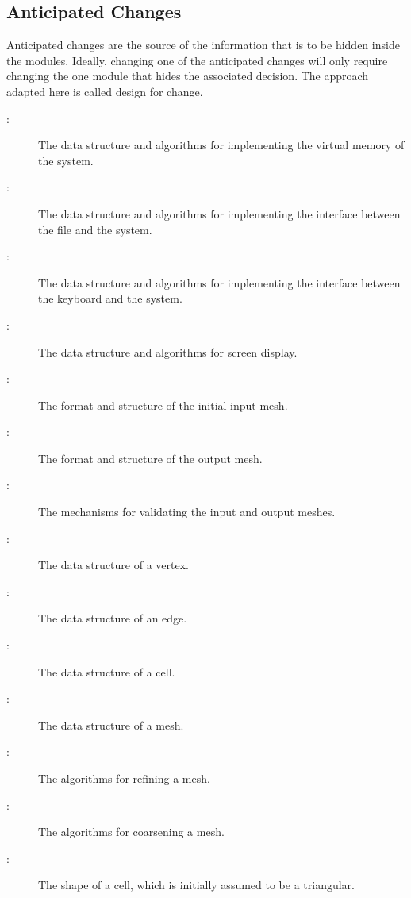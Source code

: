 \documentclass[12pt,titlepage]{article}
\begin{document}
\subsection{Anticipated Changes \label{AmgSecAchange}}
Anticipated changes are the source of the information that is to be hidden inside the modules. Ideally, changing one of the anticipated changes will only require changing the one module that hides the associated decision. The approach adapted here is called design for change. %
\begin{description}
\item[ \actheacnum \label{acMemory}:] The data structure and algorithms for implementing the virtual memory of the system.
\item[ \actheacnum \label{acFile}:] The data structure and algorithms for implementing the interface between the file and the system.
\item[ \actheacnum \label{acKeyboard}:]The data structure and algorithms for implementing the interface between the keyboard and the system.
\item[ \actheacnum \label{acScreen}:] The data structure and algorithms for screen display.
\item[ \actheacnum \label{acInput}:] The format and structure of the initial input mesh.
\item[ \actheacnum \label{acOutput}:] The format and structure of the output mesh.
\item[ \actheacnum \label{acValid}:] The mechanisms for validating the input and output meshes.
\item[ \actheacnum \label{acVertex}:] The data structure of a vertex.
\item[ \actheacnum \label{acEdge}:] The data structure of an edge.
\item[ \actheacnum \label{acCell}:] The data structure of a cell.
\item[ \actheacnum \label{acMesh}:] The data structure of a mesh.
\item[ \actheacnum \label{acRefining}:] The algorithms for refining a mesh.
\item[ \actheacnum \label{acCoarsening}:] The algorithms for coarsening a mesh.
\item[ \actheacnum \label{acTriangle}:] The shape of a cell, which is initially assumed to be a triangular. 
\end{description}
\end{document}

